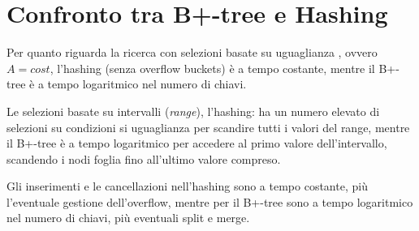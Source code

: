 \documentclass[oneside,a4paper,11pt]{book}
\theoremstyle{italicstyle}
\theoremstyle{normStyle}
\begin{document}
\begin{figure}[H]
\end{figure}
\section{Confronto tra B+-tree e Hashing}
Per quanto riguarda la ricerca con selezioni basate su uguaglianza , ovvero $A = cost$,
l'hashing (senza overflow buckets) è a tempo costante, mentre il B+-tree è a tempo 
logaritmico nel numero di chiavi.

Le selezioni basate su intervalli (\textit{range}), l'hashing: ha un numero 
elevato di selezioni su condizioni si uguaglianza per scandire tutti i valori del range, mentre 
il B+-tree è a tempo logaritmico per accedere al primo valore dell'intervallo, 
scandendo i nodi foglia fino all'ultimo valore compreso.

Gli inserimenti e le cancellazioni nell'hashing sono a tempo costante, più l'eventuale 
gestione dell'overflow, mentre per il B+-tree sono a tempo logaritmico nel numero di chiavi, 
più eventuali split e merge.
\end{document}
